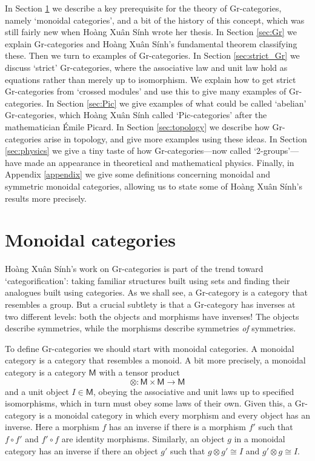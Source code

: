 \documentclass[reqno,12pt]{amsart}
\newcommand{\M}{{\mathsf{M}}}   %
\theoremstyle{definition}
\begin{document}
In Section \ref{sec:monoidal} we describe a key prerequisite for the theory of Gr-categories, namely `monoidal categories', and a bit of the history of this concept, which was still fairly new when Ho\`ang Xu\^an S\'inh wrote her thesis.  In Section \ref{sec:Gr} we explain Gr-categories and Ho\`ang Xu\^an S\'inh's fundamental theorem classifying these.  Then we turn to examples of Gr-categories.   In Section \ref{sec:strict_Gr} we discuss `strict' Gr-categories, where the associative law and unit law hold as equations rather than merely up to isomorphism.  We explain how to get strict Gr-categories from `crossed modules' and use this to give many examples of Gr-categories.  In Section \ref{sec:Pic} we give examples of what could be called `abelian' Gr-categories, which Ho\`ang Xu\^an S\'inh called `Pic-categories' after the mathematician \'Emile Picard.   In Section \ref{sec:topology} we describe how Gr-categories arise in topology, and give more examples using these ideas.   In Section \ref{sec:physics} we give a tiny taste of how Gr-categories---now called `2-groups'---have made an appearance in theoretical and mathematical physics.   Finally, in Appendix \ref{appendix} we give some definitions concerning monoidal and symmetric monoidal categories, allowing us to state some of Ho\`ang Xu\^an S\'inh's results more precisely.

\section{Monoidal categories}
\label{sec:monoidal}

Ho\`ang Xu\^an S\'inh's work on Gr-categories is part of the trend toward `categorification': taking familiar structures built using sets and finding their analogues built using categories.   As we shall see, a  Gr-category is a category that resembles a group.  But a crucial subtlety is that a Gr-category has inverses at two different levels: both the objects and morphisms have inverses!  The objects describe symmetries, while the morphisms describe symmetries \emph{of} symmetries.

To define Gr-categories we should start with monoidal categories.  A monoidal category is a category that resembles a monoid.   A bit more precisely, a monoidal category is a category $\M$ with a tensor product
\[           \otimes \colon \M \times \M \to \M \]
and a unit object $I \in \M$, obeying  the associative and unit laws up to specified isomorphisms, which in turn must obey some laws of their own.   Given this, a Gr-category is a monoidal category in which every morphism and every object has an inverse.   Here a morphism $f$ has an inverse if there is a morphism $f'$ such that $f \circ f'$ and $f' \circ f$ are identity morphisms.  Similarly, an object $g$ in a monoidal category has an inverse if there an object $g'$ such that $g \otimes g' \cong I$ and $g' \otimes g \cong I$.
\end{document}
